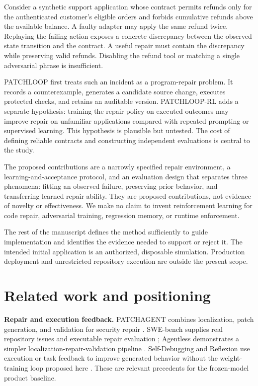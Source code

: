 \documentclass[11pt,a4paper]{article}
\begin{document}
Consider a synthetic support application whose contract permits refunds only for the authenticated customer's eligible orders and forbids cumulative refunds above the available balance. A faulty adapter may apply the same refund twice. Replaying the failing action exposes a concrete discrepancy between the observed state transition and the contract. A useful repair must contain the discrepancy while preserving valid refunds. Disabling the refund tool or matching a single adversarial phrase is insufficient.

PATCHLOOP first treats such an incident as a program-repair problem. It records a counterexample, generates a candidate source change, executes protected checks, and retains an auditable version. PATCHLOOP-RL adds a separate hypothesis: training the repair policy on executed outcomes may improve repair on unfamiliar applications compared with repeated prompting or supervised learning. This hypothesis is plausible but untested. The cost of defining reliable contracts and constructing independent evaluations is central to the study.

The proposed contributions are a narrowly specified repair environment, a learning-and-acceptance protocol, and an evaluation design that separates three phenomena: fitting an observed failure, preserving prior behavior, and transferring learned repair ability. They are proposed contributions, not evidence of novelty or effectiveness. We make no claim to invent reinforcement learning for code repair, adversarial training, regression memory, or runtime enforcement.

The rest of the manuscript defines the method sufficiently to guide implementation and identifies the evidence needed to support or reject it. The intended initial application is an authorized, disposable simulation. Production deployment and unrestricted repository execution are outside the present scope.

\section{Related work and positioning}
\textbf{Repair and execution feedback.} PATCHAGENT combines localization, patch generation, and validation for security repair \cite{ref3}. SWE-bench supplies real repository issues and executable repair evaluation \cite{ref23}; Agentless demonstrates a simpler localization-repair-validation pipeline \cite{ref24}. Self-Debugging and Reflexion use execution or task feedback to improve generated behavior without the weight-training loop proposed here \cite{ref21,ref22}. These are relevant precedents for the frozen-model product baseline.
\end{document}
